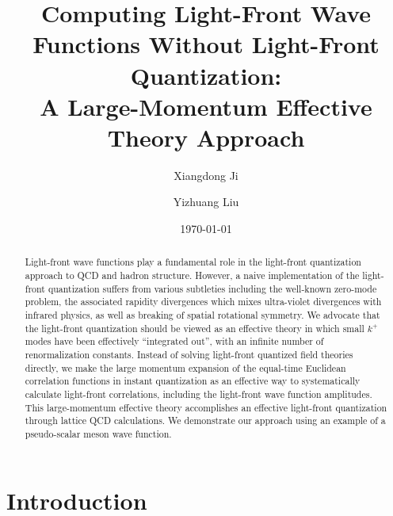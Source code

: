 \documentclass[twocolumn,superscriptaddress,longbibliography,10pt]{revtex4-1}
\begin{document}
\title{Computing Light-Front Wave Functions Without Light-Front Quantization: \\ A Large-Momentum Effective Theory Approach}

\author{Xiangdong Ji}

\author{Yizhuang Liu}


\date{\today}

\begin{abstract}
Light-front wave functions play a fundamental role in the light-front quantization approach to QCD and hadron structure. However, a naive implementation of the light-front quantization suffers from various subtleties including the well-known zero-mode problem, the associated rapidity divergences which mixes ultra-violet divergences with infrared physics, as well as breaking of spatial rotational symmetry. We advocate that the light-front quantization should be viewed as an effective theory in which small $k^+$ modes have been effectively ``integrated out'', with an infinite number of renormalization constants. Instead of solving light-front quantized field theories directly, we make the large momentum expansion of the equal-time Euclidean correlation functions in instant quantization as an effective way to systematically calculate light-front correlations, including the light-front wave function amplitudes.  This large-momentum effective theory accomplishes an effective light-front quantization through lattice QCD calculations. We demonstrate our approach using an example of a pseudo-scalar meson wave function.

\end{abstract}

\maketitle

\section{Introduction}
\end{document}
